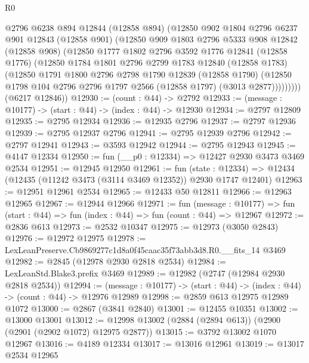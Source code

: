 \begin{lexlean}{R0}
\begin{coremodule}
          @2796
          @6238
          @894
          @12844
          (@12858 @894)
          (@12850
            @902
            @1804
            @2796
            @6237
            @901
            @12843
            (@12858 @901)
            (@12850
              @909
              @1803
              @2796
              @5333
              @908
              @12842
              (@12858 @908)
              (@12850
                @1777
                @1802
                @2796
                @3592
                @1776
                @12841
                (@12858 @1776)
                (@12850
                  @1784
                  @1801
                  @2796
                  @2799
                  @1783
                  @12840
                  (@12858 @1783)
                  (@12850
                    @1791
                    @1800
                    @2796
                    @2798
                    @1790
                    @12839
                    (@12858 @1790)
                    (@12850 @1798 @104 @2796 @2796 @1797 @2566 (@12858 @1797) (@3013 @2877)))))))))
      (@6217 @12846))
@12930 := (count : @44) -> @2792
@12933 := (message : @10177) -> (start : @44) -> (index : @44) -> @12930
@12934 := @2797 @12809
@12935 := @2795 @12934
@12936 := @12935 @2796
@12937 := @2797 @12936
@12939 := @2795 @12937 @2796
@12941 := @2795 @12939 @2796
@12942 := @2797 @12941
@12943 := @3593 @12942
@12944 := @2795 @12943
@12945 := @4147 @12334
@12950 := fun (__p0 : @12334) => @12427 @2930 @3473 @3469 @2534
@12951 := @12945 @12950
@12961 := fun (state : @12334) =>
  @12434 (@12435 (@11242 @3473 (@3114 @3469 @12352)) @2930 @1747 @12401)
@12963 := @12951 @12961 @2534
@12965 := @12433 @50 @12811
@12966 := @12963 @12965
@12967 := @12944 @12966
@12971 := fun (message : @10177) =>
  fun (start : @44) => fun (index : @44) => fun (count : @44) => @12967
@12972 := @2836 @613
@12973 := @2532 @10347
@12975 := @12973 (@3050 @2843)
@12976 := @12972 @12975
@12978 := LexLeanPreserve.Cb9869277c1d8a0f45caac35f73abb3d8.R0.__fits_14 @3469
@12982 := @2845 (@12978 @2930 @2818 @2534)
@12984 := LexLeanStd.Blake3.prefix @3469
@12989 := @12982 (@2747 (@12984 @2930 @2818 @2534))
@12994 := (message : @10177) -> (start : @44) -> (index : @44) -> (count : @44) -> @12976 @12989
@12998 := @2859 @613 @12975 @12989 @1072
@13000 := @2867 (@3841 @2840)
@13001 := @12455 @10351
@13002 := @13000 @13001
@13012 := @12998 @13002 (@2884 (@2894 @613)) (@2900 (@2901 (@2902 @1072) @12975 @2877))
@13015 := @3792 @13002 @1070 @12967
@13016 := @4189 @12334
@13017 := @13016 @12961
@13019 := @13017 @2534 @12965

\end{coremodule}
\end{lexlean}
